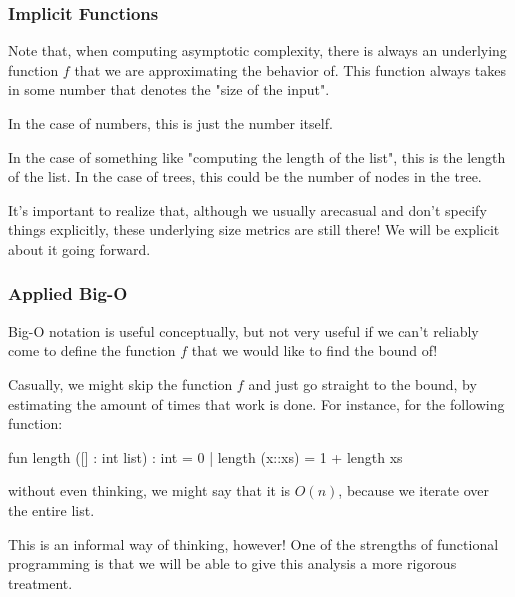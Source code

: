 \documentclass[aspectratio=169]{beamer}
\begin{document}
\begin{frame}[fragile]
  \frametitle{Implicit Functions}

  Note that, when computing asymptotic complexity, there is always an underlying
  function $f$ that we are approximating the behavior of. This function always
  takes in some number that denotes the "size of the input".

  \vspace{\fill}

  In the case of numbers, this is just the number itself.

  \pause
  \vspace{\fill}

  In the case of something like "computing the length of the list", this is the
  length of the list. In the case of trees, this could be the number of nodes in
  the tree.

  \pause
  \vspace{\fill}

  It's important to realize that, although we usually arecasual and don't specify
  things explicitly, these underlying size metrics are still there! We will be
  explicit about it going forward.
\end{frame}


\begin{frame}[fragile]
  \frametitle{Applied Big-O}

  Big-O notation is useful conceptually, but not very useful if we can't reliably
  come to define the function $f$ that we would like to find the bound of!

  \pause
  \vspace{\fill}

  Casually, we might skip the function $f$ and just go straight to the bound, by
  estimating the amount of times that work is done. For instance, for the following
  function:

  \pause
  \vspace{5pt}

  \begin{codeblock}
    fun length ([] : int list) : int = 0
      | length (x::xs) = 1 + length xs
  \end{codeblock}

  \pause
  \vspace{5pt}

  without even thinking, we might say that it is $O(n)$, because we iterate over
  the entire list.

  \pause
  \vspace{\fill}

  This is an informal way of thinking, however! One of the strengths of functional
  programming is that we will be able to give this analysis a more rigorous
  treatment.
\end{frame}
\end{document}

